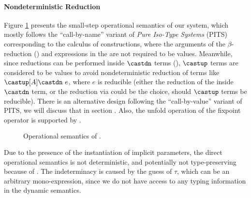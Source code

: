 \paragraph{Nondeterministic Reduction}
Figure \ref{fig:semantics} presents the small-step operational semantics of our system,
which mostly follows the ``call-by-name'' variant of \emph{Pure Iso-Type Systems} (PITS)
~\cite{yang2019pure} corresponding to the calculus of constructions, where
the arguments of the $\beta$-reduction () and expressions in
the  are not required to be values.
Meanwhile, since reductions can be performed inside $\castdn$ terms (),
$\castup$ terms are considered to be values to avoid nondeterministic reduction of
terms like $\castup [A] \castdn ~e$, where $e$ is reducible
(either the reduction of the inside $\castdn$ term, or the reduction via
 could be the choice, should $\castup$ terms be reducible).
There is an alternative design following the ``call-by-value'' variant of PITS, we
will discuss that in section .
Also, the unfold operation of the fixpoint operator is supported by .

\begin{figure}[t]
    \centering


    \caption{Operational semantics of \name.}
    \label{fig:semantics}
\end{figure}

Due to the presence of the instantiation of implicit parameters, the direct operational
semantics is not deterministic, and potentially not type-preserving because of
. The indeterminacy is caused by the guess of $\tau$,
which can be an arbitrary mono-expression, since we do not have access to any typing
information in the dynamic semantics.

